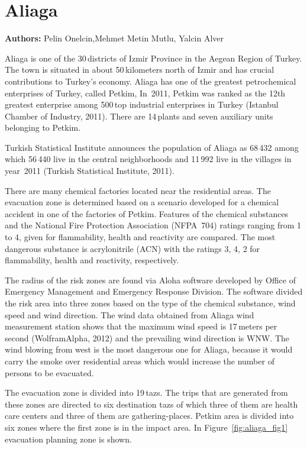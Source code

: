 \chapter{Aliaga}
\label{ch:aliaga}
\hfill \textbf{Authors:} Pelin Onelcin,Mehmet Metin Mutlu, Yalcin Alver

Aliaga is one of the 30\,districts of Izmir Province in the Aegean Region of Turkey. 
The town is situated in about 50\,kilometers north of Izmir and has crucial contributions to Turkey’s economy. 
Aliaga has one of the greatest petrochemical enterprises of Turkey, called Petkim, In~2011, Petkim was ranked as the 12th greatest enterprise among 500\,top industrial enterprises in Turkey \citep[][]{}(Istanbul Chamber of Industry, 2011). There are 14\,plants and seven auxiliary units belonging to Petkim. 

Turkish Statistical Institute announces the population of Aliaga as 68\,432 among which 56\,440 live in the central neighborhoods and 11\,992 live in the villages in year~2011 \citep[][]{} (Turkish Statistical Institute, 2011).

There are many chemical factories located near the residential areas. The evacuation zone is determined based on a scenario developed for a chemical accident in one of the factories of Petkim. Features of the chemical substances and the National Fire Protection Association (NFPA~704) ratings ranging from 1 to 4, given for flammability, health and reactivity are compared. The most dangerous substance is acrylonitrile (ACN) with the ratings 3, 4, 2 for flammability, health and reactivity, respectively.

The radius of the risk zones are found via Aloha software developed by Office of Emergency Management and Emergency Response Division. The software divided the risk area into three zones based on the type of the chemical substance, wind speed and wind direction. The wind data obtained from Aliaga wind measurement station shows that the maximum wind speed is 17\,meters per second \citep[][]{}(WolframAlpha, 2012) and the prevailing wind direction is WNW. The wind blowing from west is the most dangerous one for Aliaga, because it would carry the smoke over residential areas which would increase the number of persons to be evacuated.

The evacuation zone is divided into 19\,\glspl{taz}. The trips that are generated from these zones are directed to six destination \glspl{taz} of which three of them are health care centers and three of them are gathering-places. Petkim area is divided into six zones where the first zone is in the impact area. In Figure~\ref{fig:aliaga_fig1} evacuation planning zone is shown.

